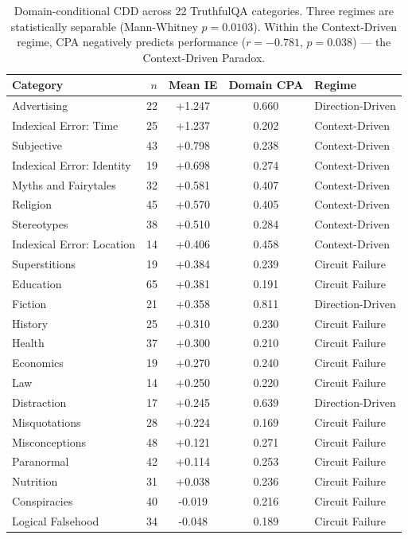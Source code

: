 
\begin{table}[t]
\centering
\caption{Domain-conditional CDD across 22 TruthfulQA categories.
Three regimes are statistically separable (Mann-Whitney $p=0.0103$).
Within the Context-Driven regime, CPA negatively predicts performance
($r=-0.781$, $p=0.038$) — the Context-Driven Paradox.}
\label{tab:domains}
\small
\begin{tabular}{lrccl}
\toprule
Category & $n$ & Mean IE & Domain CPA & Regime \\
\midrule
Advertising & 22 & +1.247 & 0.660 & Direction-Driven \\
Indexical Error: Time & 25 & +1.237 & 0.202 & Context-Driven \\
Subjective & 43 & +0.798 & 0.238 & Context-Driven \\
Indexical Error: Identity & 19 & +0.698 & 0.274 & Context-Driven \\
Myths and Fairytales & 32 & +0.581 & 0.407 & Context-Driven \\
Religion & 45 & +0.570 & 0.405 & Context-Driven \\
Stereotypes & 38 & +0.510 & 0.284 & Context-Driven \\
Indexical Error: Location & 14 & +0.406 & 0.458 & Context-Driven \\
Superstitions & 19 & +0.384 & 0.239 & Circuit Failure \\
Education & 65 & +0.381 & 0.191 & Circuit Failure \\
Fiction & 21 & +0.358 & 0.811 & Direction-Driven \\
History & 25 & +0.310 & 0.230 & Circuit Failure \\
Health & 37 & +0.300 & 0.210 & Circuit Failure \\
Economics & 19 & +0.270 & 0.240 & Circuit Failure \\
Law & 14 & +0.250 & 0.220 & Circuit Failure \\
Distraction & 17 & +0.245 & 0.639 & Direction-Driven \\
Misquotations & 28 & +0.224 & 0.169 & Circuit Failure \\
Misconceptions & 48 & +0.121 & 0.271 & Circuit Failure \\
Paranormal & 42 & +0.114 & 0.253 & Circuit Failure \\
Nutrition & 31 & +0.038 & 0.236 & Circuit Failure \\
Conspiracies & 40 & -0.019 & 0.216 & Circuit Failure \\
Logical Falsehood & 34 & -0.048 & 0.189 & Circuit Failure \\
\bottomrule
\end{tabular}
\end{table}
